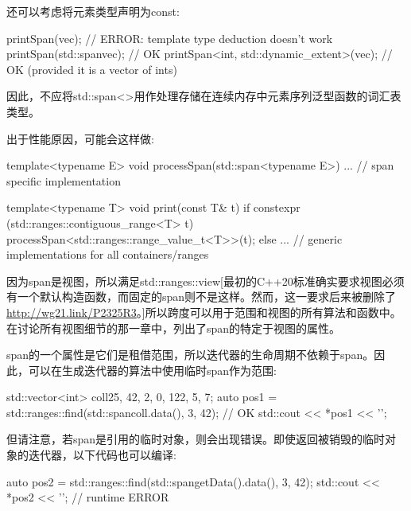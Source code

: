 还可以考虑将元素类型声明为const:

\begin{cpp}
printSpan(vec); // ERROR: template type deduction doesn’t work
printSpan(std::span{vec}); // OK
printSpan<int, std::dynamic_extent>(vec); // OK (provided it is a vector of ints)
\end{cpp}

因此，不应将std::span<>用作处理存储在连续内存中元素序列泛型函数的词汇表类型。

出于性能原因，可能会这样做:

\begin{cpp}
template<typename E>
void processSpan(std::span<typename E>) {
	... // span specific implementation
}

template<typename T>
void print(const T& t) {
	if constexpr (std::ranges::contiguous_range<T> t) {
		processSpan<std::ranges::range_value_t<T>>(t);
	}
	else {
		... // generic implementations for all containers/ranges
	}
}
\end{cpp}


因为span是视图，所以满足std::ranges::view[最初的C++20标准确实要求视图必须有一个默认构造函数，而固定的span则不是这样。然而，这一要求后来被删除了\url{http://wg21.link/P2325R3}。]所以跨度可以用于范围和视图的所有算法和函数中。在讨论所有视图细节的那一章中，列出了span的特定于视图的属性。

span的一个属性是它们是租借范围，所以迭代器的生命周期不依赖于span。因此，可以在生成迭代器的算法中使用临时span作为范围:

\begin{cpp}
std::vector<int> coll{25, 42, 2, 0, 122, 5, 7};
auto pos1 = std::ranges::find(std::span{coll.data(), 3}, 42); // OK
std::cout << *pos1 << '\n';
\end{cpp}

但请注意，若span是引用的临时对象，则会出现错误。即使返回被销毁的临时对象的迭代器，以下代码也可以编译:

\begin{cpp}
auto pos2 = std::ranges::find(std::span{getData().data(), 3}, 42);
std::cout << *pos2 << '\n'; // runtime ERROR
\end{cpp}











